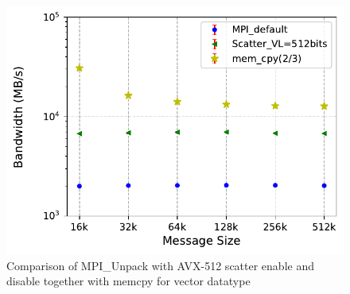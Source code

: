 \documentclass[conference]{IEEEtran}
\begin{document}
\begin{figure}[h]
    \centering
    \includegraphics[width=\linewidth]{to_self_avx_scatter_20tests_with_memcpy.pdf}
    \caption{Comparison of MPI\_Unpack with AVX-512 scatter enable and disable together with memcpy for vector datatype}
    \label{fig:scatter20}
\end{figure}
\end{document}
